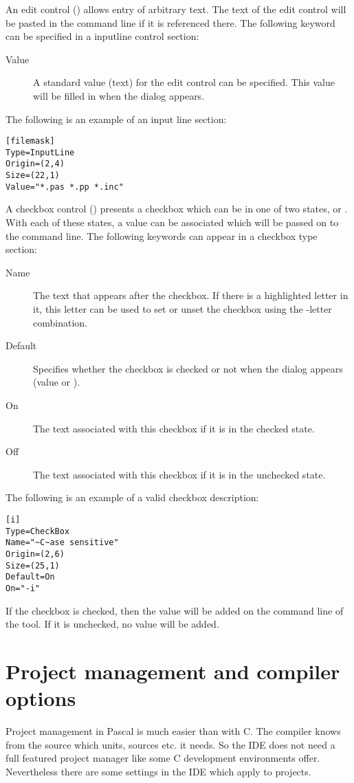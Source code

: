 An edit control () allows entry of arbitrary text.
The text of the edit control will be pasted in the command line if it
is referenced there. The following keyword can be specified in a
inputline control section:
\begin{description}
\item[Value] A standard value (text) for the edit control can be
specified. This value will be filled in when the dialog appears.
\end{description}
The following is an example of an input line section:
\begin{verbatim}
[filemask]
Type=InputLine
Origin=(2,4)
Size=(22,1)
Value="*.pas *.pp *.inc"
\end{verbatim}

A checkbox control () presents a checkbox which
can be in one of two states,  or . With each of
these states, a value can be associated which will be passed on to
the command line. The following keywords can appear in a checkbox
type section:
\begin{description}
\item[Name] The text that appears after the checkbox.
If there is a highlighted letter in it, this letter can be used
to set or unset the checkbox using the -letter combination.
\item[Default] Specifies whether the checkbox is checked or not when
the dialog appears (value  or ).
\item[On] The text associated with this checkbox if it is in the checked
state.
\item[Off] The text associated with this checkbox if it is in the
unchecked state.
\end{description}
The following is an example of a valid checkbox description:
\begin{verbatim}
[i]
Type=CheckBox
Name="~C~ase sensitive"
Origin=(2,6)
Size=(25,1)
Default=On
On="-i"
\end{verbatim}
If the checkbox is checked, then the value  will be added on
the command line of the tool. If it is unchecked, no value will be added.

\section{Project management and compiler options}
\label{se:projectmanagement}
Project management in Pascal is much easier than with C. The
compiler knows from the source which units, sources etc. it needs.
So the \fpc IDE does not need a full featured project manager like
some C development environments offer. Nevertheless there are some
settings in the IDE which apply to projects.
%
%
